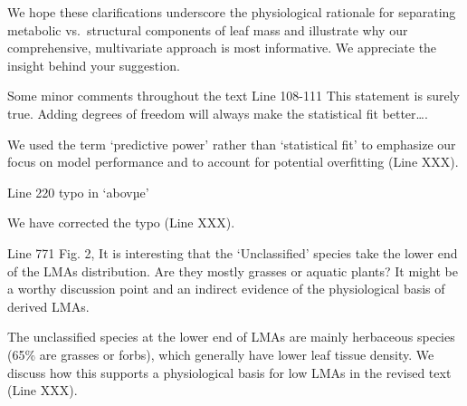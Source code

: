 \documentclass[
  12pt,
  letterpaper,
  DIV=11,
  numbers=noendperiod]{scrartcl}
\renewenvironment{quote}
  {\begin{customblockquote}\color{blockquote-text}\ignorespaces}
  {\end{customblockquote}}
\begin{document}
We hope these clarifications underscore the physiological rationale for
separating metabolic vs.~structural components of leaf mass and
illustrate why our comprehensive, multivariate approach is most
informative. We appreciate the insight behind your suggestion.

\begin{quote}
Some minor comments throughout the text Line 108-111 This statement is
surely true. Adding degrees of freedom will always make the statistical
fit better\ldots.
\end{quote}

We used the term `predictive power' rather than `statistical fit' to
emphasize our focus on model performance and to account for potential
overfitting (Line XXX).

\begin{quote}
Line 220 typo in `abovµe'
\end{quote}

We have corrected the typo (Line XXX).

\begin{quote}
Line 771 Fig. 2, It is interesting that the `Unclassified' species take
the lower end of the LMAs distribution. Are they mostly grasses or
aquatic plants? It might be a worthy discussion point and an indirect
evidence of the physiological basis of derived LMAs.
\end{quote}

The unclassified species at the lower end of LMAs are mainly herbaceous
species (65\% are grasses or forbs), which generally have lower leaf
tissue density. We discuss how this supports a physiological basis for
low LMAs in the revised text (Line XXX).
\end{document}

